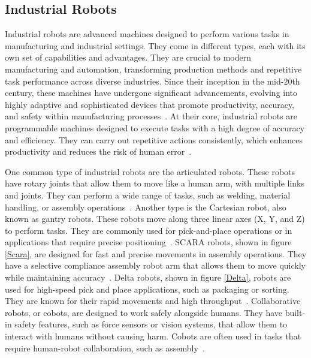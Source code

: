 

\subsection{Industrial Robots}\label{IR}
Industrial robots are advanced machines designed to perform various tasks in manufacturing and industrial settings. They come in different types, each with its own set of capabilities and advantages. They are crucial to modern manufacturing and automation, transforming production methods and repetitive task performance across diverse industries. Since their inception in the mid-20th century, these machines have undergone significant advancements, evolving into highly adaptive and sophisticated devices that promote productivity, accuracy, and safety within manufacturing processes~\cite{Ji.2019}.
At their core, industrial robots are programmable machines designed to execute tasks with a high degree of accuracy and efficiency. They can carry out repetitive actions consistently, which enhances productivity and reduces the risk of human error~\cite{Siciliano.2016}. 



One common type of industrial robots are the articulated robots. These robots have rotary joints that allow them to move like a human arm, with multiple links and joints. They can perform a wide range of tasks, such as welding, material handling, or assembly operations~\cite{Hanafusa.1981, Jain.2019}. Another type is the Cartesian robot, also known as gantry robots. These robots move along three linear axes (X, Y, and Z) to perform tasks. They are commonly used for pick-and-place operations or in applications that require precise positioning~\cite{Kim.2003}. SCARA robots, shown in figure \ref{Scara}, are designed for fast and precise movements in assembly operations. They have a selective compliance assembly robot arm that allows them to move quickly while maintaining accuracy~\cite{Das.2005}. Delta robots, shown in figure \ref{Delta}, robots are used for high-speed pick and place applications, such as packaging or sorting. They are known for their rapid movements and high throughput~\cite{bonev2001delta}. Collaborative robots, or cobots, are designed to work safely alongside humans. They have built-in safety features, such as force sensors or vision systems, that allow them to interact with humans without causing harm. Cobots are often used in tasks that require human-robot collaboration, such as assembly~\cite{Liu.2022b}.



